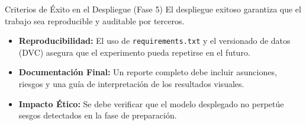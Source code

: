 \documentclass{beamer}
\begin{document}
	\begin{frame}{Criterios de Éxito en el Despliegue (Fase 5)}
		El despliegue exitoso garantiza que el trabajo sea reproducible y auditable por terceros.
		
		\begin{itemize}
			\item<2-> \textbf{Reproducibilidad:} El uso de \texttt{requirements.txt} y el versionado de datos (DVC) asegura que el experimento pueda repetirse en el futuro.
			\item<3-> \textbf{Documentación Final:} Un reporte completo debe incluir asunciones, riesgos y una guía de interpretación de los resultados visuales.
			\item<4-> \textbf{Impacto Ético:} Se debe verificar que el modelo desplegado no perpetúe sesgos detectados en la fase de preparación.
		\end{itemize}
	\end{frame}
	
\end{document}
